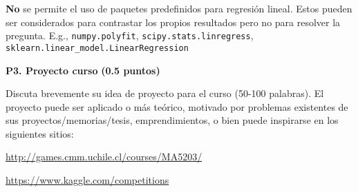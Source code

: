 \documentclass[11pt,letterpaper]{article}
\begin{document}
 \textbf{No} se permite el uso de paquetes predefinidos para regresión lineal. Estos pueden ser considerados para contrastar los propios resultados pero no para resolver la pregunta. E.g., \texttt{numpy.polyfit},  \texttt{scipy.stats.linregress}, \texttt{sklearn.linear\_model.LinearRegression}

\vspace{5 mm}
\noindent\textbf{P3. Proyecto curso} \textbf{(0.5 puntos)}
\vspace{5 mm}

Discuta brevemente su idea de proyecto para el curso (50-100 palabras). El proyecto puede ser aplicado o más teórico, motivado por problemas existentes de sus proyectos/memorias/tesis, emprendimientos, o bien puede inspirarse en los siguientes sitios:

\vspace{1em}
\centerline{\url{http://games.cmm.uchile.cl/courses/MA5203/}}
\centerline{\url{https://www.kaggle.com/competitions}}
\vspace{1em}


\vspace{2em}
\end{document}
